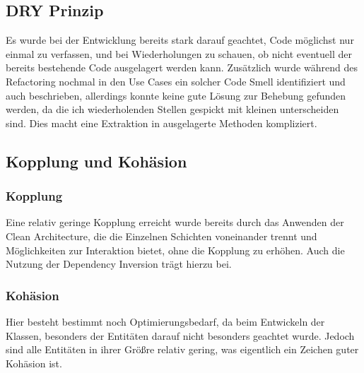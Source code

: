 \subsection*{DRY Prinzip}
Es wurde bei der Entwicklung bereits stark darauf geachtet, Code möglichst nur einmal zu verfassen, und bei Wiederholungen zu schauen, ob nicht eventuell der bereits bestehende Code ausgelagert werden kann. Zusätzlich wurde während des Refactoring nochmal in den Use Cases ein solcher Code Smell identifiziert und auch beschrieben, allerdings konnte keine gute Lösung zur Behebung gefunden werden, da die ich wiederholenden Stellen gespickt mit kleinen unterscheiden sind. Dies macht eine Extraktion in ausgelagerte Methoden kompliziert.
\subsection*{Kopplung und Kohäsion}
\subsubsection*{Kopplung}
Eine relativ geringe Kopplung erreicht wurde bereits durch das Anwenden der Clean Architecture, die die Einzelnen Schichten voneinander trennt und Möglichkeiten zur Interaktion bietet, ohne die Kopplung zu erhöhen. Auch die Nutzung der Dependency Inversion trägt hierzu bei.
\subsubsection*{Kohäsion}
Hier besteht bestimmt noch Optimierungsbedarf, da beim Entwickeln der Klassen, besonders der Entitäten darauf nicht besonders geachtet wurde. Jedoch sind alle Entitäten in ihrer Größre relativ gering, was eigentlich ein Zeichen guter Kohäsion ist. 